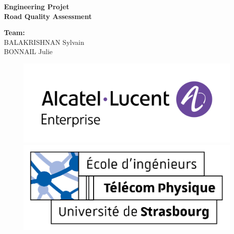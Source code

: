 \documentclass{article}
\begin{document}
\thispagestyle{empty}
\addtocounter{page}{-1}
\begin{center}
    \baselineskip=50pt
    \vspace*{1cm}
    \textbf{{\Huge Engineering Projet}}\\
    \vspace*{0.25cm}
    \textbf{{\Huge Road Quality Assessment}}\\
    \vspace*{0.25cm}
    \begin{minipage}[c]{.46\linewidth}
        \centering
        \textbf{Team:}\\
        BALAKRISHNAN Sylvain\\BONNAIL Julie
    \end{minipage}
\end{center}
\vspace*{0.1cm}

\begin{figure}[H]
    \centering
    \centerline{\includegraphics[scale=.76]{img/AL_Enterprise_logo_RGB.png}}
    \vspace*{0.1cm}
    \centerline{\includegraphics[scale=1.25]{img/logo_TPS_2.png}}
\end{figure}

\newpage
\renewcommand{\contentsname}{Table of contents}
\tableofcontents

\newpage
\renewcommand{\listfigurename}{List of figures}
\listoffigures

\newpage












\end{document}
